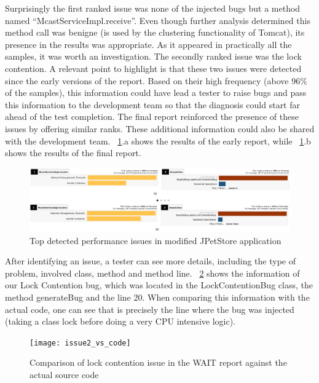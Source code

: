 \documentclass[runningheads,a4paper]{llncs}
\begin{document}
Surprisingly the first ranked issue was none of the injected bugs but a method
named ``McastServiceImpl.receive''. Even though further analysis determined
this method call was benigne (is used by the clustering functionality of
Tomcat), its presence in the results was appropriate. As it appeared in
practically all the samples, it was worth an investigation. The secondly ranked
issue was the lock contention. A relevant point to highlight is that these two
issues were detected since the early versions of the report. Based on their high
frequency (above 96\% of the samples), this information could have lead a 
tester to raise bugs and pass this information to the development team so that
the diagnosis could start far ahead of the test completion. The final report
reinforced the presence of these issues by offering similar ranks. These
additional information could also be shared with the development team.
\figurename ~\ref{fig_run1_bugs12}.a shows the results of the early report,
while ~\ref{fig_run1_bugs12}.b shows the results of the final report.

\begin{figure}[!h]
\includegraphics[totalheight=.23\textheight,width=1\textwidth]{run1_issues12_short_long_run}
\caption{Top detected performance issues in modified JPetStore application}
\label{fig_run1_bugs12}
\end{figure}

After identifying an issue, a tester can see more details, including the type of
problem, involved class, method and method line. \figurename
~\ref{fig_issue2_vs_code} shows the information of our Lock Contention bug,
which was located in the LockContentionBug class, the method generateBug and
the line 20. When comparing this information with the actual code, one can see
that is precisely the line where the bug was injected (taking a class lock
before doing a very CPU intensive logic).

\begin{figure}[!h]
\texttt{[image: issue2\_vs\_code]}
\caption{Comparison of lock contention issue in the WAIT report against the
actual source code}
\label{fig_issue2_vs_code}
\end{figure}
\end{document}
